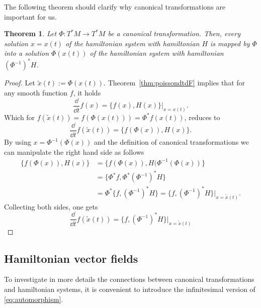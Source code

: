 \documentclass[english,fontsize=11pt,paper=b5]{scrbook}
\newtheorem{theorem}{Theorem}[chapter]
\theoremstyle{definition}
\begin{document}
    The following theorem should clarify why canonical transformations are important for us.
    \begin{theorem}\label{thm:canonicalmapping}
      Let $\Phi: T^*M \to T^* M$ be a canonical transformation.
      Then, every solution $x = x(t)$ of the hamiltonian system with hamiltonian $H$ is mapped by $\Phi$ into a solution $\Phi(x(t))$ of the hamiltonian system with hamiltonian $(\Phi^{-1})^* H$.
    \end{theorem}
    \begin{proof}
      Let $\widetilde x(t) := \Phi(x(t))$. Theorem~\ref{thm:poissondtdF} implies that for any smooth function $f$, it holds
      \begin{equation}
        \frac{\dd}{\dd t} f(x) = \big\{f(x), H(x)\big\}\Big|_{x=x(t)}.
      \end{equation}
      Which for $f(\widetilde x(t)) = f(\Phi(x(t))) = \Phi^* f(x(t))$, reduces to
      \begin{equation}
        \frac{\dd}{\dd t} f(\widetilde x(t)) = \big\{f(\Phi(x)), H(x)\big\}.
      \end{equation}
      By using $x = \Phi^{-1}(\Phi(x))$ and the definition of canonical transformations we can manipulate the right hand side as follows
      \begin{align}
        \big\{f(\Phi(x)), H(x)\big\} & = \big\{f(\Phi(x)), H(\Phi^{-1}(\Phi(x))\big\}                                                     \\
                                     & = \big\{\Phi^* f, \Phi^* (\Phi^{-1})^* H\big\}                                                     \\
                                     & = \Phi^* \big\{f, (\Phi^{-1})^* H\big\} = \big\{f, (\Phi^{-1})^* H\big\}\Big|_{x=\widetilde x(t)}.
      \end{align}
      Collecting both sides, one gets
      \begin{equation}
        \frac{\dd}{\dd t} f(\widetilde x(t)) = \big\{f, (\Phi^{-1})^* H\big\}\Big|_{x=\widetilde x(t)}
      \end{equation}
    \end{proof}

    \subsection{Hamiltonian vector fields}

    To investigate in more details the connections between canonical transformations and hamiltonian systems, it is convenient to introduce the infinitesimal version of \eqref{eq:automorphism}.
\end{document}
